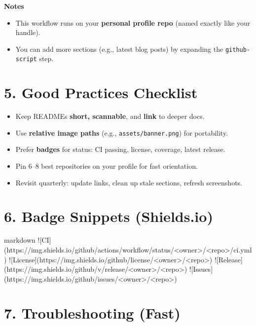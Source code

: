 \documentclass[11pt]{article}
\renewcommand{\kbd}[1]{\texttt{#1}}
\begin{document}
\begin{tcolorbox}
\textbf{Notes}
\begin{itemize}
  \item This workflow runs on your \textbf{personal profile repo} (named exactly like your handle).
  \item You can add more sections (e.g., latest blog posts) by expanding the \kbd{github-script} step.
\end{itemize}
\end{tcolorbox}

\section*{5. Good Practices Checklist}

\begin{itemize}
  \item Keep READMEs \textbf{short, scannable}, and \textbf{link} to deeper docs.
  \item Use \textbf{relative image paths} (e.g., \kbd{assets/banner.png}) for portability.
  \item Prefer \textbf{badges} for status: CI passing, license, coverage, latest release.
  \item Pin 6--8 best repositories on your profile for fast orientation.
  \item Revisit quarterly: update links, clean up stale sections, refresh screenshots.
\end{itemize}

\section*{6. Badge Snippets (Shields.io)}

\begin{code}{markdown}
![CI](https://img.shields.io/github/actions/workflow/status/<owner>/<repo>/ci.yml)
![License](https://img.shields.io/github/license/<owner>/<repo>)
![Release](https://img.shields.io/github/v/release/<owner>/<repo>)
![Issues](https://img.shields.io/github/issues/<owner>/<repo>)
\end{code}

\section*{7. Troubleshooting (Fast)}
\end{document}
